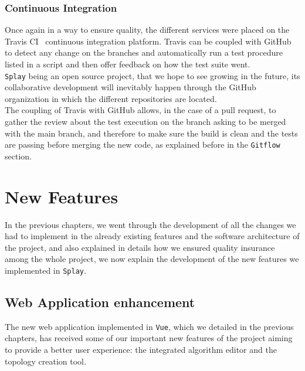 \documentclass{eplmastersthesis}
\begin{document}
      \subsection{Continuous Integration}

        Once again in a way to ensure quality, the different services were placed
        on the Travis CI~\cite{travis} continuous integration platform. Travis
        can be coupled with GitHub to detect any change on the branches and
        automatically run a test procedure listed in a script and then offer
        feedback on how the test suite went.\\

        \texttt{Splay} being an open source project, that we hope to see growing in the
        future, its collaborative development will inevitably happen through
        the GitHub organization in which the different repositories are located.\\
        The coupling of Travis with GitHub allows, in the case of a pull request,
        to gather the review about the test execution on the branch asking to be
        merged with the main branch, and therefore to make sure the build is
        clean and the tests are passing before merging the new code, as
        explained before in the \texttt{Gitflow} section.

    \chapter{New Features}
    \label{chap:newfeat}

      In the previous chapters, we went through the development of all
      the changes we had to implement in the already existing features
      and the software architecture of the project, and also explained
      in details how we ensured quality insurance among the whole project,
      we now explain the development of the new features we implemented in
      \texttt{Splay}.

      \section{Web Application enhancement}

        The new web application implemented in \texttt{Vue}, which we detailed in
        the previous chapters, has received some of our important new features
        of the project aiming to provide a better user experience: the
        integrated algorithm editor and the topology creation tool.
\end{document}
